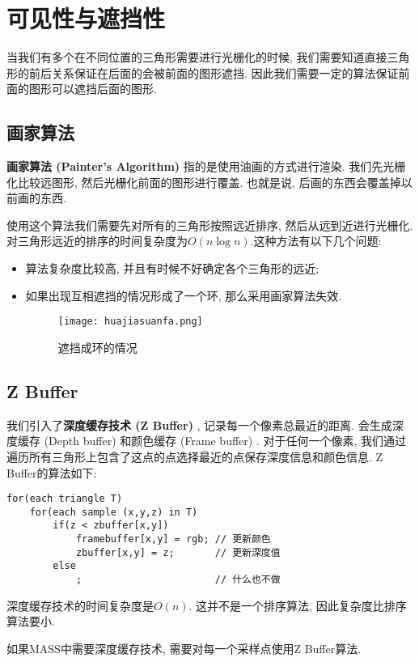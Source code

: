 \section{可见性与遮挡性}
当我们有多个在不同位置的三角形需要进行光栅化的时候, 我们需要知道直接三角形的前后关系保证在后面的会被前面的图形遮挡. 因此我们需要一定的算法保证前面的图形可以遮挡后面的图形. 

\subsection{画家算法}
\textbf{画家算法 (Painter's Algorithm) }指的是使用油画的方式进行渲染. 我们先光栅化比较远图形, 然后光栅化前面的图形进行覆盖. 
也就是说, 后画的东西会覆盖掉以前画的东西.

使用这个算法我们需要先对所有的三角形按照远近排序, 然后从远到近进行光栅化. 对三角形远近的排序的时间复杂度为$O(n\log n)$.这种方法有以下几个问题: 
\begin{itemize}
	\item 算法复杂度比较高, 并且有时候不好确定各个三角形的远近; 
	\item 如果出现互相遮挡的情况形成了一个环, 那么采用画家算法失效. 
	\begin{figure}[H]
		\centering
		\texttt{[image: huajiasuanfa.png]}
		\caption{遮挡成环的情况}
		\label{fig:zhedang}
	\end{figure}
	
\end{itemize}

\subsection{Z Buffer}
我们引入了\textbf{深度缓存技术 (Z Buffer) }, 记录每一个像素总最近的距离. 会生成深度缓存 (Depth buffer) 和颜色缓存 (Frame buffer) . 对于任何一个像素, 我们通过遍历所有三角形上包含了这点的点选择最近的点保存深度信息和颜色信息. 
Z Buffer的算法如下: 
\begin{lstlisting}
for(each triangle T)
	for(each sample (x,y,z) in T)
		if(z < zbuffer[x,y])
			framebuffer[x,y] = rgb; // 更新颜色
			zbuffer[x,y] = z;       // 更新深度值
		else
			;                       // 什么也不做
\end{lstlisting}
深度缓存技术的时间复杂度是$O(n)$. 这并不是一个排序算法, 因此复杂度比排序算法要小.

如果MASS中需要深度缓存技术, 需要对每一个采样点使用Z Buffer算法. 
